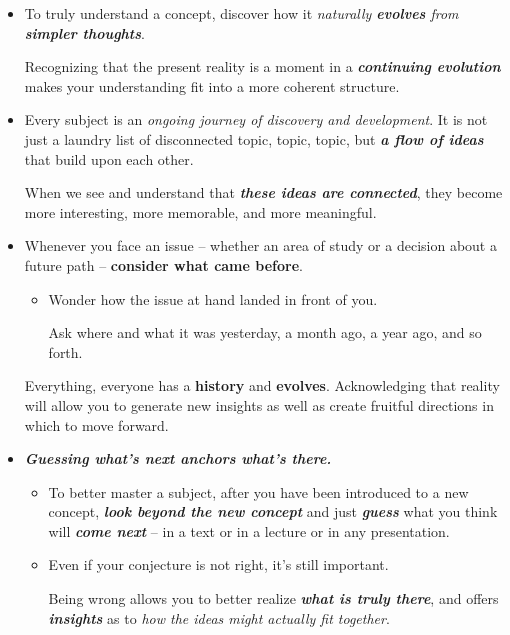 \documentclass[11pt]{article}
\begin{document}
\begin{itemize}
\item To truly understand a concept, discover how it \emph{naturally \textbf{evolves} from \textbf{simpler thoughts}}. 

Recognizing that the present reality is a moment in a \emph{\textbf{continuing evolution}} makes your understanding fit into a more coherent structure.

\item Every subject is an \emph{ongoing journey of discovery and development}. It is not just a laundry list of disconnected topic, topic, topic, but \emph{\textbf{a flow of ideas}} that build upon each other. 

When we see and understand that \emph{\textbf{these ideas are connected}}, they become more interesting, more memorable, and more meaningful.

\item \begin{exercise}
Whenever you face an issue -- whether an area of study or a decision about a future path -- \textbf{consider what came before}. 
\begin{itemize}
\item Wonder how the issue at hand landed in front of you. 

Ask where and what it was yesterday, a month ago, a year ago, and so forth.
\end{itemize}
Everything, everyone has a \textbf{history} and \textbf{evolves}. Acknowledging that reality will allow you to generate new insights as well as create fruitful directions in which to move forward.
\end{exercise}

\item \emph{\textbf{Guessing what’s next anchors what’s there.}}
\begin{itemize}
\item To better master a subject, after you have been introduced to a new concept, \textbf{\emph{look beyond the new concept}} and just \emph{\textbf{guess}} what you think will \emph{\textbf{come next}} -- in a text or in a lecture or in any presentation. 

\item Even if your conjecture is not right, it’s still important. 

Being wrong allows you to better realize \emph{\textbf{what is truly there}}, and offers \emph{\textbf{insights}} as to \emph{how the ideas might actually fit together}.


\end{itemize}
\end{itemize}
\end{document}
